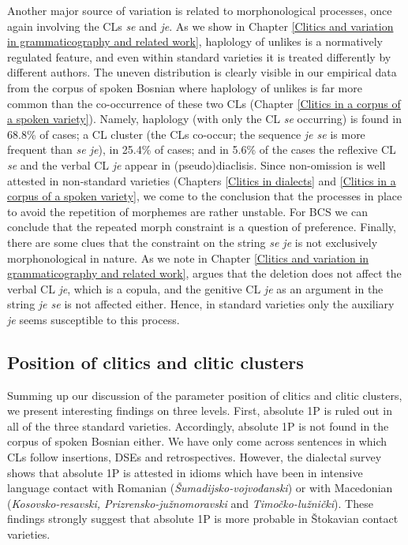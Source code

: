 Another major source of variation is related to morphonological processes, once again involving the CLs \textit{se} and \textit{je}. As we show in Chapter \ref{Clitics and variation in grammaticography and related work}, haplology of unlikes is a normatively regulated feature, and even within standard varieties it is treated differently by different authors. The uneven distribution is clearly visible in our empirical data from the corpus of spoken Bosnian where haplology of unlikes is far more common than the co-occurrence of these two CLs (Chapter \ref{Clitics in a corpus of a spoken variety}). Namely, haplology (with only the CL \textit{se} occurring) is found in 68.8\% of cases; a CL cluster (the CLs co-occur; the sequence \textit{je se} is more frequent than \textit{se je}), in 25.4\% of cases; and in 5.6\% of the cases the reflexive CL \textit{se} and the verbal CL \textit{je} appear in (pseudo)diaclisis. Since non-omission is well attested in non-standard varieties (Chapters \ref{Clitics in dialects} and \ref{Clitics in a corpus of a spoken variety}, we come to the conclusion that the processes in place to avoid the repetition of morphemes are rather unstable. For BCS we can conclude that the repeated morph constraint is a question of preference. Finally, there are some clues that the constraint on the string \textit{se je} is not exclusively morphonological in nature. As we note in Chapter \ref{Clitics and variation in grammaticography and related work}, \citet[564]{Ridjanovic12} argues that the deletion does not affect the verbal CL \textit{je}, which is a copula, and the genitive CL \textit{je} as an argument in the string \textit{je se} is not affected either. Hence, in standard varieties only the auxiliary \textit{je}  seems susceptible to this process.



\subsection{Position of clitics and clitic clusters}

Summing up our discussion of the parameter position of clitics and clitic clusters, we present interesting findings on three levels. First, absolute 1P is ruled out in all of the three standard varieties. Accordingly, absolute 1P is not found in the corpus of spoken Bosnian either. We have only come across sentences in which CLs follow insertions, DSEs and retrospectives. However, the dialectal survey shows that absolute 1P is attested in idioms which have been in intensive language contact with Romanian (\textit{Šumadijsko-vojvođanski}) or with Macedonian (\textit{Kosovsko-resavski, Prizrensko-južnomoravski} and \textit{Timočko-lužnički}). These findings strongly suggest that absolute 1P is more probable in Štokavian contact varieties. 

